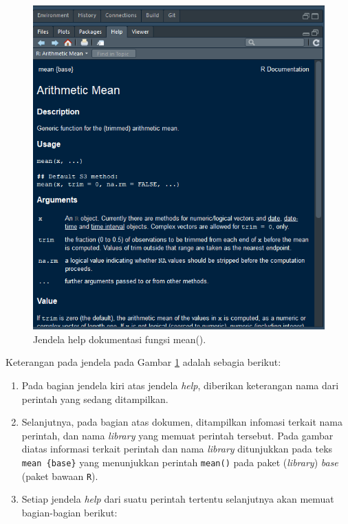 \documentclass[]{book}
\providecommand{\tightlist}{%
  \setlength{\itemsep}{0pt}\setlength{\parskip}{0pt}}
\begin{document}
\begin{figure}

{\centering \includegraphics[width=0.5\linewidth]{meandoc} 

}

\caption{Jendela help dokumentasi fungsi mean().}\label{fig:meandoc}
\end{figure}

Keterangan pada jendela pada Gambar \ref{fig:meandoc} adalah sebagia
berikut:

\begin{enumerate}
\def\labelenumi{\arabic{enumi}.}
\tightlist
\item
  Pada bagian jendela kiri atas jendela \emph{help}, diberikan
  keterangan nama dari perintah yang sedang ditampilkan.
\item
  Selanjutnya, pada bagian atas dokumen, ditampilkan infomasi terkait
  nama perintah, dan nama \emph{library} yang memuat perintah tersebut.
  Pada gambar diatas informasi terkait perintah dan nama \emph{library}
  ditunjukkan pada teks \texttt{mean\ \{base\}} yang menunjukkan
  perintah \texttt{mean()} pada paket (\emph{library}) \emph{base}
  (paket bawaan \texttt{R}).
\item
  Setiap jendela \emph{help} dari suatu perintah tertentu selanjutnya
  akan memuat bagian-bagian berikut:
\end{enumerate}
\end{document}
